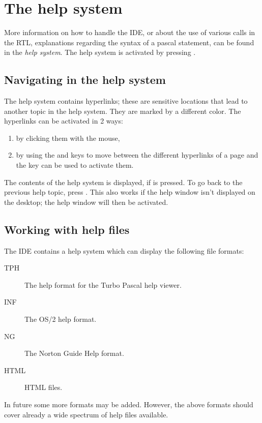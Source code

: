 \section{The help system}

More information on how to handle the IDE, or about the use of various
calls in the RTL, explanations regarding the syntax of a pascal statement,
can be found in the \emph{help system}. The help system is activated
by pressing .

\subsection{Navigating in the help system}
The help system contains hyperlinks; these are sensitive locations that
lead to another topic in the help system. They are marked by a different
color. The hyperlinks can be activated in 2 ways:
\begin{enumerate}
\item by clicking them with the mouse,
\item by using the  and  keys to move between 
the different hyperlinks of a page and the  key can be used 
to activate them.
\end{enumerate}

The contents of the help system is displayed, if  is
pressed. To go back to the previous help topic, press . 
This also works if the help window isn't displayed on the desktop; the help
window will then be activated.

%
%
\subsection{Working with help files}
The IDE contains a help system which can display the following file formats:
\begin{description}
\item[TPH] The help format for the Turbo Pascal help viewer.
\item[INF] The OS/2 help format.
\item[NG] The Norton Guide Help format.
\item[HTML] HTML files. 
\end{description}
In future some more formats may be added. However, the above formats should 
cover already a wide spectrum of help files available.

